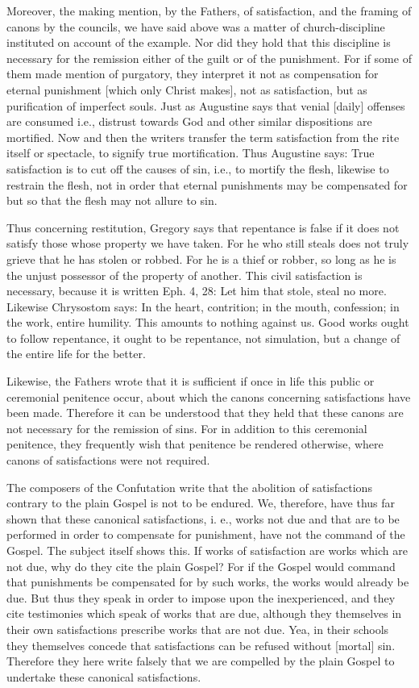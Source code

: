 Moreover, the making mention, by the Fathers, of satisfaction, and
the framing of canons by the councils, we have said above was a
matter of church-discipline instituted on account of the example.
Nor did they hold that this discipline is necessary for the remission
either of the guilt or of the punishment.  For if some of them made
mention of purgatory, they interpret it not as compensation for
eternal punishment [which only Christ makes], not as satisfaction,
but as purification of imperfect souls.  Just as Augustine says that
venial [daily] offenses are consumed i.e., distrust towards God and
other similar dispositions are mortified.  Now and then the writers
transfer the term satisfaction from the rite itself or spectacle, to
signify true mortification.  Thus Augustine says: True satisfaction
is to cut off the causes of sin, i.e., to mortify the flesh, likewise
to restrain the flesh, not in order that eternal punishments may be
compensated for but so that the flesh may not allure to sin.

Thus concerning restitution, Gregory says that repentance is false if
it does not satisfy those whose property we have taken.  For he who
still steals does not truly grieve that he has stolen or robbed.  For
he is a thief or robber, so long as he is the unjust possessor of the
property of another.  This civil satisfaction is necessary, because
it is written Eph. 4, 28: Let him that stole, steal no more.
Likewise Chrysostom says: In the heart, contrition; in the mouth,
confession; in the work, entire humility.  This amounts to nothing
against us.  Good works ought to follow repentance, it ought to be
repentance, not simulation, but a change of the entire life for the
better.

Likewise, the Fathers wrote that it is sufficient if once in life
this public or ceremonial penitence occur, about which the canons
concerning satisfactions have been made.  Therefore it can be
understood that they held that these canons are not necessary for the
remission of sins.  For in addition to this ceremonial penitence,
they frequently wish that penitence be rendered otherwise, where
canons of satisfactions were not required.

The composers of the Confutation write that the abolition of
satisfactions contrary to the plain Gospel is not to be endured.  We,
therefore, have thus far shown that these canonical satisfactions, i.
e., works not due and that are to be performed in order to compensate
for punishment, have not the command of the Gospel.  The subject
itself shows this.  If works of satisfaction are works which are not
due, why do they cite the plain Gospel?  For if the Gospel would
command that punishments be compensated for by such works, the works
would already be due.  But thus they speak in order to impose upon
the inexperienced, and they cite testimonies which speak of works
that are due, although they themselves in their own satisfactions
prescribe works that are not due.  Yea, in their schools they
themselves concede that satisfactions can be refused without [mortal]
sin.  Therefore they here write falsely that we are compelled by the
plain Gospel to undertake these canonical satisfactions.

